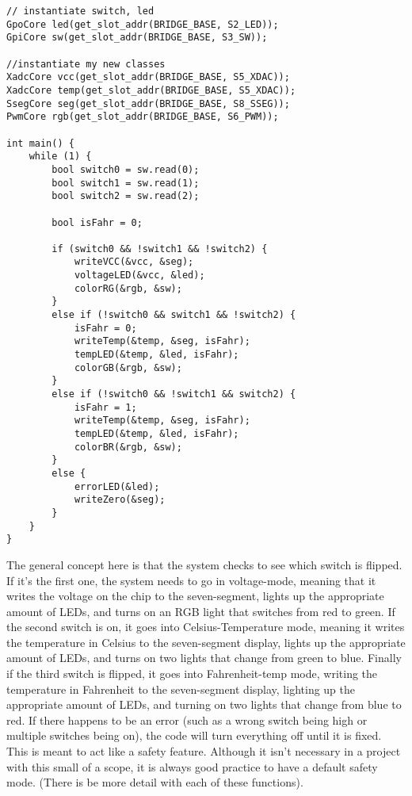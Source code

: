 \documentclass[11pt]{article}
\begin{document}
\begin{lstlisting}[style=CStyle, caption = Declarations and Main]
// instantiate switch, led
GpoCore led(get_slot_addr(BRIDGE_BASE, S2_LED));
GpiCore sw(get_slot_addr(BRIDGE_BASE, S3_SW));

//instantiate my new classes
XadcCore vcc(get_slot_addr(BRIDGE_BASE, S5_XDAC));
XadcCore temp(get_slot_addr(BRIDGE_BASE, S5_XDAC));
SsegCore seg(get_slot_addr(BRIDGE_BASE, S8_SSEG));
PwmCore rgb(get_slot_addr(BRIDGE_BASE, S6_PWM));

int main() {
	while (1) {
		bool switch0 = sw.read(0);
		bool switch1 = sw.read(1);
		bool switch2 = sw.read(2);
		
		bool isFahr = 0;
		
		if (switch0 && !switch1 && !switch2) {
			writeVCC(&vcc, &seg);
			voltageLED(&vcc, &led);
			colorRG(&rgb, &sw);
		}
		else if (!switch0 && switch1 && !switch2) {
			isFahr = 0;
			writeTemp(&temp, &seg, isFahr);
			tempLED(&temp, &led, isFahr);
			colorGB(&rgb, &sw);
		}
		else if (!switch0 && !switch1 && switch2) {
			isFahr = 1;
			writeTemp(&temp, &seg, isFahr);
			tempLED(&temp, &led, isFahr);
			colorBR(&rgb, &sw);
		}
		else {
			errorLED(&led);
			writeZero(&seg);
		}
	}
}

\end{lstlisting}

\quad The general concept here is that the system checks to see which switch is flipped. If it's the first one, the system needs to go in voltage-mode, meaning that it writes the voltage on the chip to the seven-segment, lights up the appropriate amount of LEDs, and turns on an RGB light that switches from red to green. If the second switch is on, it goes into Celsius-Temperature mode, meaning it writes the temperature in Celsius to the seven-segment display, lights up the appropriate amount of LEDs, and turns on two lights that change from green to blue. Finally if the third switch is flipped, it goes into Fahrenheit-temp mode, writing the temperature in Fahrenheit to the seven-segment display, lighting up the appropriate amount of LEDs, and turning on two lights that change from blue to red. If there happens to be an error (such as a wrong switch being high or multiple switches being on), the code will turn everything off until it is fixed. This is meant to act like a safety feature. Although it isn't necessary in a project with this small of a scope, it is always good practice to have a default safety mode. (There is be more detail with each of these functions).
\end{document}
